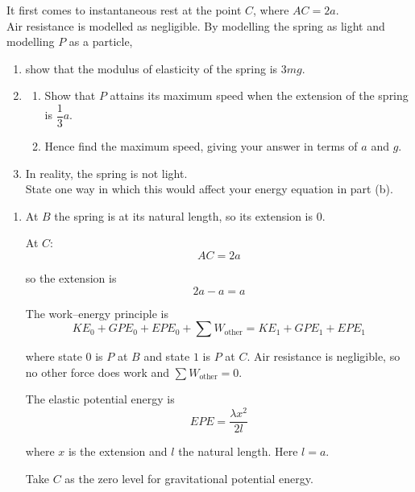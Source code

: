 \documentclass[leqno]{article}
\begin{document}
\begin{enumerate}[
  label=\textbf{\arabic*.},
  leftmargin=*,
  topsep=0pt,
  partopsep=0pt,
  parsep=0pt
]
It first comes to instantaneous rest at the point $C$, where $AC=2a$. \\

Air resistance is modelled as negligible. By modelling the spring as light and modelling $P$ as a particle, \\
\begin{enumerate}[label=\textbf{(\alph*)}]
  \item show that the modulus of elasticity of the spring is $3mg$.  \\
  \item
  \begin{enumerate}[label=(\roman*)]
    \item Show that $P$ attains its maximum speed when the extension of the spring is $\dfrac{1}{3}a$. 
    \item Hence find the maximum speed, giving your answer in terms of $a$ and $g$.  \\
  \end{enumerate}
  \item In reality, the spring is not light. \\
  State one way in which this would affect your energy equation in part (b).  \\
\end{enumerate}

\vspace*{10pt}

\begin{djsSolution}
\begin{enumerate}[label=\textbf{(\alph*)}, start=1]
  \item At \(B\) the spring is at its natural length, so its extension is \(0\).

At \(C\):
\[
AC=2a
\]

so the extension is
\[
2a-a=a
\]

The work--energy principle is
\[
KE_0+GPE_0+EPE_0+\sum W_{\text{other}}=KE_1+GPE_1+EPE_1
\]

where state \(0\) is \(P\) at \(B\) and state \(1\) is \(P\) at \(C\). Air resistance is negligible, so no other force does work and \(\sum W_{\text{other}}=0\).

The elastic potential energy is
\[
EPE=\frac{\lambda x^2}{2l}
\]

where \(x\) is the extension and \(l\) the natural length. Here \(l=a\).

Take \(C\) as the zero level for gravitational potential energy.


\end{enumerate}
\end{djsSolution}
\end{enumerate}
\end{document}
